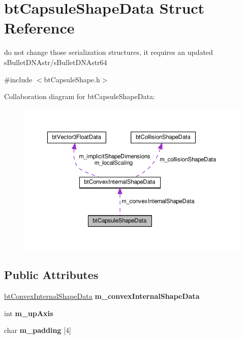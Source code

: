 \hypertarget{structbtCapsuleShapeData}{}\section{bt\+Capsule\+Shape\+Data Struct Reference}
\label{structbtCapsuleShapeData}


do not change those serialization structures, it requires an updated s\+Bullet\+D\+N\+Astr/s\+Bullet\+D\+N\+Astr64  




{\ttfamily \#include $<$bt\+Capsule\+Shape.\+h$>$}



Collaboration diagram for bt\+Capsule\+Shape\+Data\+:
\nopagebreak
\begin{figure}[H]
\begin{center}
\leavevmode
\includegraphics[width=350pt]{structbtCapsuleShapeData__coll__graph}
\end{center}
\end{figure}
\subsection*{Public Attributes}
\begin{DoxyCompactItemize}
\item 
\mbox{\label{structbtCapsuleShapeData_a86a0d8a17ef2d9910e1c755845a5f353}} 
\hyperlink{structbtConvexInternalShapeData}{bt\+Convex\+Internal\+Shape\+Data} {\bfseries m\+\_\+convex\+Internal\+Shape\+Data}
\item 
\mbox{\label{structbtCapsuleShapeData_a49e41ca440c0504025e9b1d546faaea2}} 
int {\bfseries m\+\_\+up\+Axis}
\item 
\mbox{\label{structbtCapsuleShapeData_aa0a117700755e5e386343cc0b000a3ed}} 
char {\bfseries m\+\_\+padding} \mbox{[}4\mbox{]}
\end{DoxyCompactItemize}


